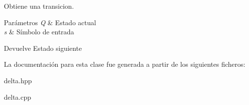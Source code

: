 Obtiene una transicion. 


\begin{DoxyParams}{Parámetros}
{\em Q} & Estado actual \\
\hline
{\em s} & Símbolo de entrada \\
\hline
\end{DoxyParams}
\begin{DoxyReturn}{Devuelve}
Estado siguiente 
\end{DoxyReturn}


La documentación para esta clase fue generada a partir de los siguientes ficheros\+:\begin{DoxyCompactItemize}
\item 
delta.\+hpp\item 
delta.\+cpp\end{DoxyCompactItemize}
